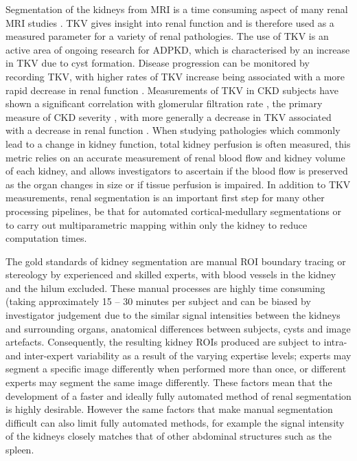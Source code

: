 Segmentation of the kidneys from \ac{MRI} is a time consuming aspect of many renal \ac{MRI} studies \cite{cox_multiparametric_2017, cohen_mri_2009, van_den_dool_functional_2005}. \ac{TKV} gives insight into renal function and is therefore used as a measured parameter for a variety of renal pathologies. The use of \ac{TKV} is an active area of ongoing research for \ac{ADPKD}, which is characterised by an increase in \ac{TKV} due to cyst formation. Disease progression can be monitored by recording \ac{TKV}, with higher rates of \ac{TKV} increase being associated with a more rapid decrease in renal function \cite{chapman_kidney_2012, tangri_total_2017, grantham_volume_2006}. Measurements of \ac{TKV} in \ac{CKD} subjects have shown a significant correlation with glomerular filtration rate \cite{buchanan_quantitative_2019}, the primary measure of \ac{CKD} severity \cite{stevens_assessing_2006}, with more generally a decrease in \ac{TKV} associated with a decrease in renal function \cite{gong_relationship_2012}. When studying pathologies which commonly lead to a change in kidney function, total kidney perfusion is often measured, this metric relies on an accurate measurement of renal blood flow and kidney volume of each kidney, and allows investigators to ascertain if the blood flow is preserved as the organ changes in size or if tissue perfusion is impaired. In addition to \ac{TKV} measurements, renal segmentation is an important first step for many other processing pipelines, be that for automated cortical-medullary segmentations or to carry out multiparametric mapping within only the kidney to reduce computation times. 

The gold standards of kidney segmentation are manual \ac{ROI} boundary tracing \cite{di_leo_measurement_2011} or stereology \cite{bae_volumetric_2000} by experienced and skilled experts, with blood vessels in the kidney and the hilum excluded. These manual processes are highly time consuming (taking approximately 15 – 30 minutes per subject \cite{zollner_assessment_2012, sharma_kidney_2017, simms_rapid_2019} and can be biased by investigator judgement due to the similar signal intensities between the kidneys and surrounding organs, anatomical differences between subjects, cysts and image artefacts. Consequently, the resulting kidney \ac{ROI}s produced are subject to intra- and inter-expert variability as a result of the varying expertise levels; experts may segment a specific image differently when performed more than once, or different experts may segment the same image differently. These factors mean that the development of a faster and ideally fully automated method of renal segmentation is highly desirable. However the same factors that make manual segmentation difficult can also limit fully automated methods, for example the signal intensity of the kidneys closely matches that of other abdominal structures such as the spleen.

